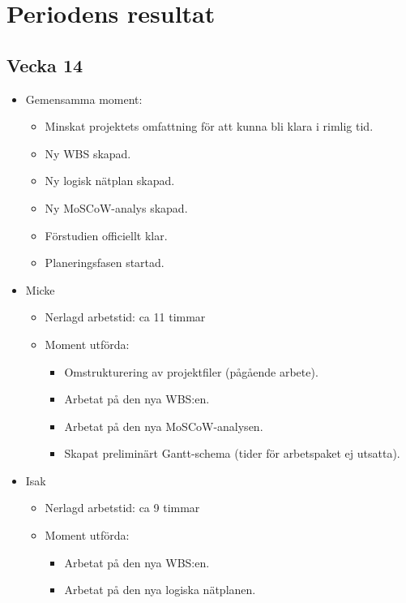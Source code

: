 \section{Periodens resultat}
\subsection*{Vecka 14}

\begin{itemize}[noitemsep]
    \item Gemensamma moment:
    \begin{itemize}[noitemsep]
        \item Minskat projektets omfattning för att kunna bli klara i rimlig tid.
        \item Ny WBS skapad.
        \item Ny logisk nätplan skapad.
        \item Ny MoSCoW-analys skapad.
        \item Förstudien officiellt klar.
        \item Planeringsfasen startad.
    \end{itemize}
    \item Micke
    \begin{itemize}[noitemsep]
        \item Nerlagd arbetstid: ca 11 timmar
        \item Moment utförda:
        \begin{itemize}[noitemsep]
            \item Omstrukturering av projektfiler (pågående arbete).
            \item Arbetat på den nya WBS:en.
            \item Arbetat på den nya MoSCoW-analysen.
            \item Skapat preliminärt Gantt-schema (tider för arbetspaket ej utsatta).
        \end{itemize}
    \end{itemize}
    \item Isak
    \begin{itemize}[noitemsep]
        \item Nerlagd arbetstid: ca 9 timmar
        \item Moment utförda:
        \begin{itemize}[noitemsep]
            \item Arbetat på den nya WBS:en.
            \item Arbetat på den nya logiska nätplanen.

\end{itemize}
\end{itemize}
\end{itemize}
